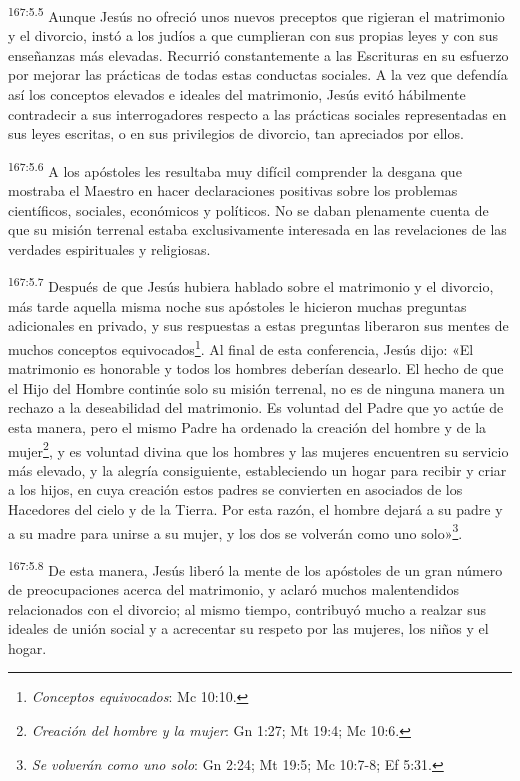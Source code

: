 \par
\textsuperscript{167:5.5} Aunque Jesús no ofreció unos nuevos preceptos que rigieran el matrimonio y el divorcio, instó a los judíos a que cumplieran con sus propias leyes y con sus enseñanzas más elevadas. Recurrió constantemente a las Escrituras en su esfuerzo por mejorar las prácticas de todas estas conductas sociales. A la vez que defendía así los conceptos elevados e ideales del matrimonio, Jesús evitó hábilmente contradecir a sus interrogadores respecto a las prácticas sociales representadas en sus leyes escritas, o en sus privilegios de divorcio, tan apreciados por ellos.

\par
\textsuperscript{167:5.6} A los apóstoles les resultaba muy difícil comprender la desgana que mostraba el Maestro en hacer declaraciones positivas sobre los problemas científicos, sociales, económicos y políticos. No se daban plenamente cuenta de que su misión terrenal estaba exclusivamente interesada en las revelaciones de las verdades espirituales y religiosas.

\par
\textsuperscript{167:5.7} Después de que Jesús hubiera hablado sobre el matrimonio y el divorcio, más tarde aquella misma noche sus apóstoles le hicieron muchas preguntas adicionales en privado, y sus respuestas a estas preguntas liberaron sus mentes de muchos conceptos equivocados\footnote{\textit{Conceptos equivocados}: Mc 10:10.}. Al final de esta conferencia, Jesús dijo: «El matrimonio es honorable y todos los hombres deberían desearlo. El hecho de que el Hijo del Hombre continúe solo su misión terrenal, no es de ninguna manera un rechazo a la deseabilidad del matrimonio. Es voluntad del Padre que yo actúe de esta manera, pero el mismo Padre ha ordenado la creación del hombre y de la mujer\footnote{\textit{Creación del hombre y la mujer}: Gn 1:27; Mt 19:4; Mc 10:6.}, y es voluntad divina que los hombres y las mujeres encuentren su servicio más elevado, y la alegría consiguiente, estableciendo un hogar para recibir y criar a los hijos, en cuya creación estos padres se convierten en asociados de los Hacedores del cielo y de la Tierra. Por esta razón, el hombre dejará a su padre y a su madre para unirse a su mujer, y los dos se volverán como uno solo»\footnote{\textit{Se volverán como uno solo}: Gn 2:24; Mt 19:5; Mc 10:7-8; Ef 5:31.}.

\par
\textsuperscript{167:5.8} De esta manera, Jesús liberó la mente de los apóstoles de un gran número de preocupaciones acerca del matrimonio, y aclaró muchos malentendidos relacionados con el divorcio; al mismo tiempo, contribuyó mucho a realzar sus ideales de unión social y a acrecentar su respeto por las mujeres, los niños y el hogar.

